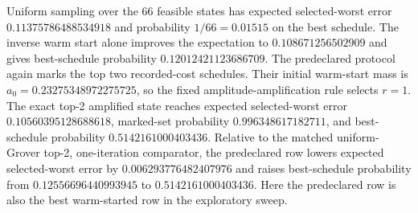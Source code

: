 \documentclass[preprint,12pt]{elsarticle}
\begin{document}
Uniform sampling over the 66 feasible states has expected selected-worst error $0.11375786488534918$ and probability $1/66=0.01515$ on the best schedule. The inverse warm start alone improves the expectation to $0.108671256502909$ and gives best-schedule probability $0.12012421123686709$. The predeclared protocol again marks the top two recorded-cost schedules. Their initial warm-start mass is $a_0=0.23275348972275725$, so the fixed amplitude-amplification rule selects $r=1$. The exact top-2 amplified state reaches expected selected-worst error $0.10560395128688618$, marked-set probability $0.996348617182711$, and best-schedule probability $0.5142161000403436$. Relative to the matched uniform-Grover top-2, one-iteration comparator, the predeclared row lowers expected selected-worst error by $0.006293776482407976$ and raises best-schedule probability from $0.12556696440993945$ to $0.5142161000403436$. Here the predeclared row is also the best warm-started row in the exploratory sweep.

\begin{table}[t]
\centering
\caption{Diagnostic \texttt{k10\_full} feasible-subspace amplitude amplification over the 66 feasible Hamming-weight-10 schedules. The \texttt{predeclared\_protocol} row is retained as a top-2-oracle ablation; \texttt{exploratory\_sweep} rows are diagnostics.}
\label{tab:structured_grover_k10_full}
\resizebox{\textwidth}{!}{}
\end{table}

\begin{table}[t]
\centering
\caption{Exploratory best warm-started \texttt{k10\_full} Grover row versus feasible-subspace and QAOA comparators. This table is retained as a diagnostic; the predeclared protocol audit is Table~\ref{tab:structured_grover_k10_full_audit}.}
\label{tab:structured_grover_k10_full_comparison}
\resizebox{\textwidth}{!}{}
\end{table}

\begin{table}[t]
\centering
\caption{\texttt{k10\_full} predeclared-protocol selection-bias audit. Deltas are comparator minus the predeclared expected selected-worst error, so positive values favor the predeclared row. The generic QAOA median is descriptive and not like-for-like.}
\label{tab:structured_grover_k10_full_audit}
\resizebox{\textwidth}{!}{}
\end{table}
\end{document}
